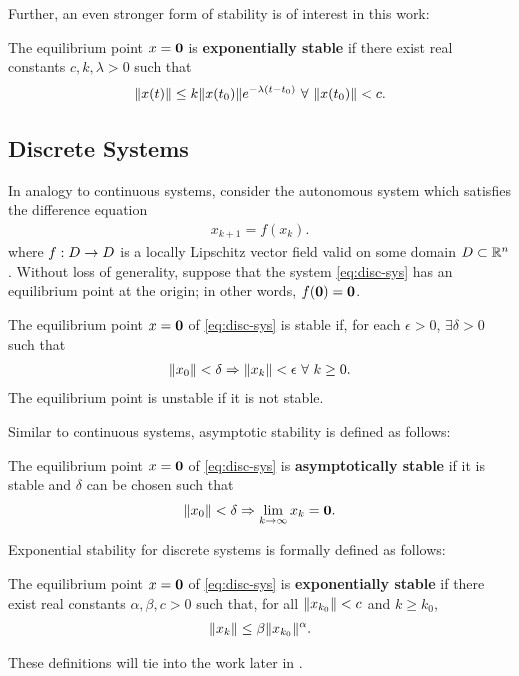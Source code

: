 Further, an even stronger form of stability is of interest in this work:
%
\begin{definition}
  The equilibrium point $x = {\mathbf 0}$ is {\bf exponentially stable} if there
  exist real constants $c, k, \lambda > 0$ such that
  \begin{align*}
    \nxt \leq k \nxtnaught e^{-\lambda (t - t_{0})} \ \forall \ \nxtnaught
    < c.
  \end{align*}
\end{definition}


\subsection{Discrete Systems}

In analogy to continuous systems, consider the autonomous system which satisfies
the difference equation
\begin{align}
  \label{eq:disc-sys}
  x_{k+1} = f(x_{k}).
\end{align}
where $f : D \to D$ is a locally Lipschitz vector field valid on some domain
$D \subset \mathbb{R}^{n}$.
%
Without loss of generality, suppose that the system \eqref{eq:disc-sys} has an
equilibrium point at the origin;
%
in other words, $f({\mathbf 0}) = {\mathbf 0}$.
%
\begin{definition}
  The equilibrium point $x = {\mathbf 0}$ of \eqref{eq:disc-sys} is stable if,
  for each $\epsilon > 0$, $\exists \delta > 0$ such that
  \begin{align*}
    \|x_{0}\| < \delta \Rightarrow \|x_{k}\| < \epsilon \ \forall \ k
    \geq 0.
  \end{align*}
  The equilibrium point is unstable if it is not stable.
\end{definition}
%
Similar to continuous systems, asymptotic stability is defined as follows:
%
\begin{definition}
  The equilibrium point $x = {\mathbf 0}$ of \eqref{eq:disc-sys} is {\bf
    asymptotically stable} if it is stable and $\delta$ can be chosen such that
  \begin{align*}
    \|x_{0}\| < \delta \Rightarrow \lim_{k \to \infty} x_{k} = {\mathbf 0}.
  \end{align*}
\end{definition}
%
Exponential stability for discrete systems is formally defined as follows:
%
\begin{definition}
  The equilibrium point $x = {\mathbf 0}$ of \eqref{eq:disc-sys} is {\bf
    exponentially stable} if there exist real constants $\alpha, \beta, c> 0$
  such that, for all $\|x_{k_{0}}\| < c$ and $k \geq k_{0}$,
  \begin{align*}
    \|x_{k}\| \leq \beta \|x_{k_{0}}\|^{\alpha}.
  \end{align*}
\end{definition}
%
These definitions will tie into the work later in .


